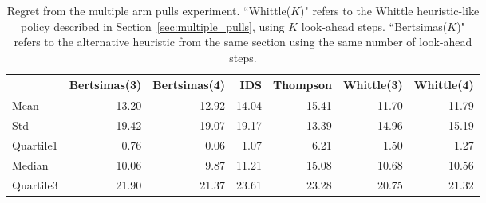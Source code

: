 \begin{table}
	\centering
	\begin{tabular}{lrrrrrr}
		\toprule
		{} &  Bertsimas(3) &  Bertsimas(4) &   IDS &  Thompson &  Whittle(3) &  Whittle(4) \\
		\midrule
		Mean      &         13.20 &         12.92 & 14.04 &     15.41 &       11.70 &       11.79 \\
		Std       &         19.42 &         19.07 & 19.17 &     13.39 &       14.96 &       15.19 \\
		Quartile1 &          0.76 &          0.06 &  1.07 &      6.21 &        1.50 &        1.27 \\
		Median    &         10.06 &          9.87 & 11.21 &     15.08 &       10.68 &       10.56 \\
		Quartile3 &         21.90 &         21.37 & 23.61 &     23.28 &       20.75 &       21.32 \\
		\bottomrule
	\end{tabular}
	\caption{Regret from the multiple arm pulls experiment. ``Whittle($K$)" refers to the Whittle heuristic-like policy described in Section~\ref{sec:multiple_pulls}, using $K$ look-ahead steps. ``Bertsimas($K$)" refers to the alternative heuristic from the same section using the same number of look-ahead steps.}
	\label{table:restless1_summary}
\end{table}